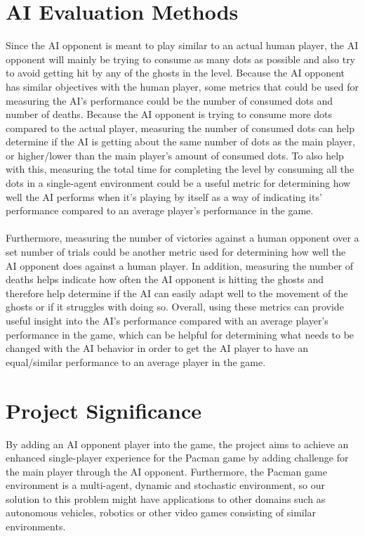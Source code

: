 \documentclass[letterpaper]{article} %
\begin{document}
\section{AI Evaluation Methods}
Since the AI opponent is meant to play similar to an actual human player, the AI opponent will mainly be trying to consume as many dots as possible and also try to avoid getting hit by any of the ghosts in the level. Because the AI opponent has similar objectives with the human player, some metrics that could be used for measuring the AI’s performance could be the number of consumed dots and number of deaths. Because the AI opponent is trying to consume more dots compared to the actual player, measuring the number of consumed dots can help determine if the AI is getting about the same number of dots as the main player, or higher/lower than the main player’s amount of consumed dots. To also help with this, measuring the total time for completing the level by consuming all the dots in a single-agent environment could be a useful metric for determining how well the AI performs when it’s playing by itself as a way of indicating its’ performance compared to an average player’s performance in the game. 
\\ \\
Furthermore, measuring the number of victories against a human opponent over a set number of trials could be another metric used for determining how well the AI opponent does against a human player. In addition, measuring the number of deaths helps indicate how often the AI opponent is hitting the ghosts and therefore help determine if the AI can easily adapt well to the movement of the ghosts or if it struggles with doing so. Overall, using these metrics can provide useful insight into the AI’s performance compared with an average player’s performance in the game, which can be helpful for determining what needs to be changed with the AI behavior in order to get the AI player to have an equal/similar performance to an average player in the game.


\section{Project Significance}
By adding an AI opponent player into the game, the project aims to achieve an enhanced single-player experience for the Pacman game by adding challenge for the main player through the AI opponent. Furthermore, the Pacman game environment is a multi-agent, dynamic and stochastic environment, so our solution to this problem might have applications to other domains such as autonomous vehicles, robotics or other video games consisting of similar environments.
\end{document}

